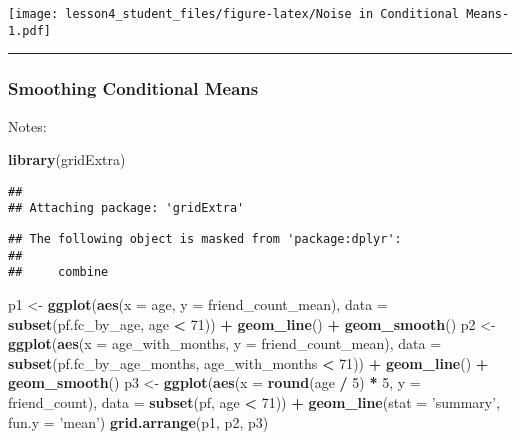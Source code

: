 \documentclass[]{article}
\newenvironment{Shaded}{\begin{snugshade}}{\end{snugshade}}
\newcommand{\KeywordTok}[1]{\textcolor[rgb]{0.13,0.29,0.53}{\textbf{#1}}}
\newcommand{\DataTypeTok}[1]{\textcolor[rgb]{0.13,0.29,0.53}{#1}}
\newcommand{\DecValTok}[1]{\textcolor[rgb]{0.00,0.00,0.81}{#1}}
\newcommand{\StringTok}[1]{\textcolor[rgb]{0.31,0.60,0.02}{#1}}
\newcommand{\OperatorTok}[1]{\textcolor[rgb]{0.81,0.36,0.00}{\textbf{#1}}}
\newcommand{\NormalTok}[1]{#1}
\begin{document}
\texttt{[image: lesson4\_student\_files/figure-latex/Noise in Conditional Means-1.pdf]}

\begin{center}\rule{0.5\linewidth}{\linethickness}\end{center}

\subsubsection{Smoothing Conditional
Means}\label{smoothing-conditional-means}

Notes:

\begin{Shaded}
\begin{Highlighting}[]
\KeywordTok{library}\NormalTok{(gridExtra)}
\end{Highlighting}
\end{Shaded}

\begin{verbatim}
## 
## Attaching package: 'gridExtra'
\end{verbatim}

\begin{verbatim}
## The following object is masked from 'package:dplyr':
## 
##     combine
\end{verbatim}

\begin{Shaded}
\begin{Highlighting}[]
\NormalTok{p1 <-}\StringTok{ }\KeywordTok{ggplot}\NormalTok{(}\KeywordTok{aes}\NormalTok{(}\DataTypeTok{x =}\NormalTok{ age, }\DataTypeTok{y =}\NormalTok{ friend_count_mean), }\DataTypeTok{data =} \KeywordTok{subset}\NormalTok{(pf.fc_by_age, age }\OperatorTok{<}\StringTok{ }\DecValTok{71}\NormalTok{)) }\OperatorTok{+}
\StringTok{  }\KeywordTok{geom_line}\NormalTok{() }\OperatorTok{+}
\StringTok{  }\KeywordTok{geom_smooth}\NormalTok{()}
\NormalTok{p2 <-}\StringTok{ }\KeywordTok{ggplot}\NormalTok{(}\KeywordTok{aes}\NormalTok{(}\DataTypeTok{x =}\NormalTok{ age_with_months, }\DataTypeTok{y =}\NormalTok{ friend_count_mean), }\DataTypeTok{data =} \KeywordTok{subset}\NormalTok{(pf.fc_by_age_months, age_with_months }\OperatorTok{<}\StringTok{ }\DecValTok{71}\NormalTok{)) }\OperatorTok{+}
\StringTok{  }\KeywordTok{geom_line}\NormalTok{() }\OperatorTok{+}
\StringTok{  }\KeywordTok{geom_smooth}\NormalTok{()}
\NormalTok{p3 <-}\StringTok{ }\KeywordTok{ggplot}\NormalTok{(}\KeywordTok{aes}\NormalTok{(}\DataTypeTok{x =} \KeywordTok{round}\NormalTok{(age }\OperatorTok{/}\StringTok{ }\DecValTok{5}\NormalTok{) }\OperatorTok{*}\StringTok{ }\DecValTok{5}\NormalTok{, }\DataTypeTok{y =}\NormalTok{ friend_count), }\DataTypeTok{data =} \KeywordTok{subset}\NormalTok{(pf, age }\OperatorTok{<}\StringTok{ }\DecValTok{71}\NormalTok{)) }\OperatorTok{+}
\StringTok{  }\KeywordTok{geom_line}\NormalTok{(}\DataTypeTok{stat =} \StringTok{'summary'}\NormalTok{, }\DataTypeTok{fun.y =} \StringTok{'mean'}\NormalTok{)}
\KeywordTok{grid.arrange}\NormalTok{(p1, p2, p3)}
\end{Highlighting}
\end{Shaded}
\end{document}
